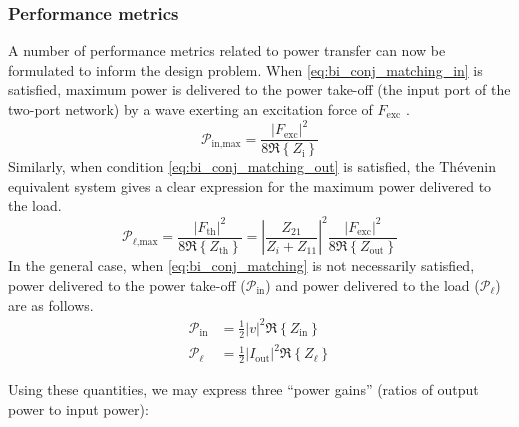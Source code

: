 \documentclass[5p,times]{elsarticle}
\begin{document}
\subsubsection{Performance metrics}\label{sec:performance_metrics}
A number of performance metrics related to power transfer can now be formulated to inform the design problem.
When \eqref{eq:bi_conj_matching_in} is satisfied, maximum power is delivered to the power take-off (the input port of the two-port network) by a wave exerting an excitation force of $F_{\textrm{exc}}$ \cite{Falnes:2002aa}.
%
\begin{equation}
        \mathcal{P}_{\textrm{in,max}} = \frac{| F_{\textrm{exc}} |^2 }{ 8 \Re \left\{ Z_{\textrm{i}} \right\} }
\end{equation}
%
Similarly, when condition \eqref{eq:bi_conj_matching_out} is satisfied, the Th\'{e}venin equivalent system gives a clear expression for the maximum power delivered to the load.
%
\begin{equation}
        \mathcal{P}_{\ell\textrm{,max}} = \frac{| F_{\textrm{th}} |^2 }{ 8 \Re \left\{ Z_{\textrm{th}} \right\} }
        = \left| \frac{ Z_{21} }{ Z_i + Z_{11} } \right| ^2 \frac{ | F_{\textrm{exc}} |^2 }{ 8 \Re \left\{ Z_{\textrm{out}} \right\} } \label{eq:max_power_delivered_thevenin}
\end{equation}
%
In the general case, when \eqref{eq:bi_conj_matching} is not necessarily satisfied, power delivered to the power take-off ($\mathcal{P}_{\textrm{in}}$) and power delivered to the load ($\mathcal{P}_\ell$) are as follows.
\begin{subequations}
        \begin{align}
                \mathcal{P}_{\textrm{in}} &= \frac{1}{2} \left| v \right|^2 \Re \left\{ Z_{\textrm{in}} \right\}\\
                \mathcal{P}_\ell &= \frac{1}{2} \left| I_{\textrm{out}} \right|^2 \Re \left\{ Z_{\ell} \right\}
        \end{align}
\end{subequations}

Using these quantities, we may express three ``power gains'' (ratios of output power to input power):
\end{document}
